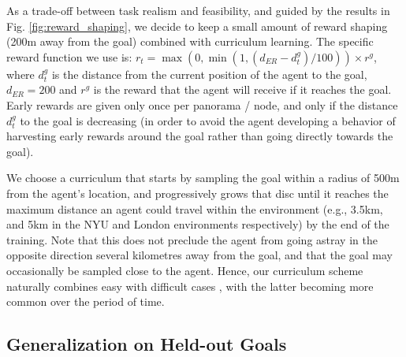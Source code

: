 As a trade-off between task realism and feasibility, and guided by the results in Fig. \ref{fig:reward_shaping}, we decide to keep a small amount of reward shaping (200m away from the goal) combined with curriculum learning. The specific reward function we use is: $r_t = \max ( 0, \min ( 1, (d_{ER} - d^g_t) / 100 ) ) \times r^g$, where $d^g_t$ is the distance from the current position of the agent to the goal, $d_{ER}=200$ and $r^g$ is the reward that the agent will receive if it reaches the goal. Early rewards are given only once per panorama / node, and only if the distance $d^g_t$ to the goal is decreasing (in order to avoid the agent developing a behavior of harvesting early rewards around the goal rather than going directly towards the goal).

We choose a curriculum that starts by sampling the goal within a radius of 500m from the agent's location, and progressively grows that disc until it reaches the maximum distance an agent could travel within the environment (e.g., 3.5km, and 5km in the NYU and London environments respectively) by the end of the training. Note that this does not preclude the agent from going astray in the opposite direction several kilometres away from the goal, and that the goal may occasionally be sampled close to the agent. Hence, our curriculum scheme naturally combines easy with difficult cases \cite{zaremba2014learning}, with the latter becoming more common over the period of time.


\subsection{Generalization on Held-out Goals}
\label{sec:heldout}


